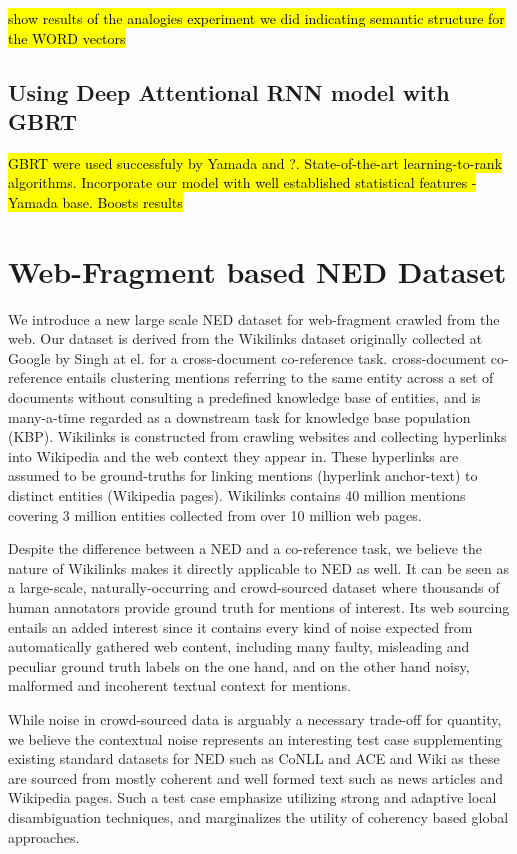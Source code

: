 \documentclass[11pt]{article}
\begin{document}
\hl{show results of the analogies experiment we did indicating semantic structure for the WORD vectors}

\subsection{Using Deep Attentional RNN model with GBRT}

\hl{GBRT were used successfuly by Yamada and ?. State-of-the-art learning-to-rank algorithms. Incorporate our model with well established statistical features - Yamada base. Boosts results }

\section{Web-Fragment based NED Dataset}
We introduce a new large scale NED dataset for web-fragment crawled from the web. Our dataset is derived from the Wikilinks dataset originally collected at Google by Singh at el. \cite{singh12:wiki-links} for a cross-document co-reference task. cross-document co-reference entails clustering mentions referring to the same entity across a set of documents without consulting a predefined knowledge base of entities, and is many-a-time regarded as a downstream task for knowledge base population (KBP). Wikilinks is constructed from crawling websites and collecting hyperlinks into Wikipedia and the web context they appear in. These hyperlinks are assumed to be ground-truths for linking mentions (hyperlink anchor-text) to distinct entities (Wikipedia pages). Wikilinks contains 40 million mentions covering 3 million entities collected from over 10 million web pages.

Despite the difference between a NED and a co-reference task, we believe the nature of Wikilinks makes it directly applicable to NED as well. It can be seen as a large-scale, naturally-occurring and crowd-sourced dataset where thousands of human annotators provide ground truth for mentions of interest. Its web sourcing entails an added interest since it contains every kind of noise expected from automatically gathered web content, including many faulty, misleading and peculiar ground truth labels on the one hand, and on the other hand noisy, malformed and incoherent textual context for mentions. 

While noise in crowd-sourced data is arguably a necessary trade-off for quantity, we believe the contextual noise represents an interesting test case supplementing existing standard datasets for NED such as CoNLL \cite{hoffart2011robust} and ACE and Wiki \cite{ratinov2011local} as these are sourced from mostly coherent and well formed text such as news articles and Wikipedia pages. Such a test case emphasize utilizing strong and adaptive local disambiguation techniques, and marginalizes the utility of coherency based global approaches.
\end{document}
